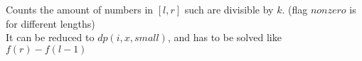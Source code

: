 Counts the amount of numbers in $[l, r]$ such are divisible by $k$. (flag $nonzero$ is for different lengths)  \\
It can be reduced to $dp(i, x, small)$, and has to be solved like $f(r) - f(l - 1)$ \\